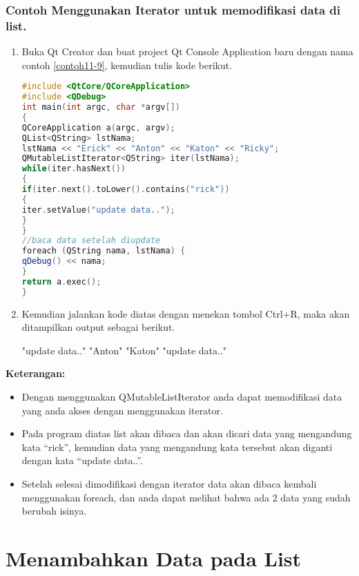 \subsubsection*{Contoh  Menggunakan Iterator untuk memodifikasi data di list.}

\begin{enumerate}

\item
  Buka Qt Creator dan buat project Qt Console Application baru dengan
  nama contoh \ref{contoh11-9}, kemudian tulis kode berikut.

\begin{lstlisting}[language=c++, caption= Menggunakan Iterator untuk memodifikasi data di list, label=contoh11-9]
#include <QtCore/QCoreApplication>
#include <QDebug>
int main(int argc, char *argv[])
{
QCoreApplication a(argc, argv);
QList<QString> lstNama;
lstNama << "Erick" << "Anton" << "Katon" << "Ricky";
QMutableListIterator<QString> iter(lstNama);
while(iter.hasNext())
{
if(iter.next().toLower().contains("rick"))
{
iter.setValue("update data..");
}
}
//baca data setelah diupdate
foreach (QString nama, lstNama) {
qDebug() << nama;
}
return a.exec();
}
\end{lstlisting}
\item
  Kemudian jalankan kode diatas dengan menekan tombol Ctrl+R, maka akan
  ditampilkan output sebagai berikut.

\begin{lcverbatim}
"update data.."
"Anton"
"Katon"
"update data.."
\end{lcverbatim}
\end{enumerate}

\textbf{Keterangan:}

\begin{itemize}

\item
  Dengan menggunakan QMutableListIterator anda dapat memodifikasi data
  yang anda akses dengan menggunakan iterator.
\item
  Pada program diatas list akan dibaca dan akan dicari data yang
  mengandung kata ``rick'', kemudian data yang mengandung kata tersebut
  akan diganti dengan kata ``update data..''.
\item
  Setelah selesai dimodifikasi dengan iterator data akan dibaca kembali
  menggunakan foreach, dan anda dapat melihat bahwa ada 2 data yang
  sudah berubah isinya.
\end{itemize}

\section{Menambahkan Data pada List}\label{menambahkan-data-pada-list}

